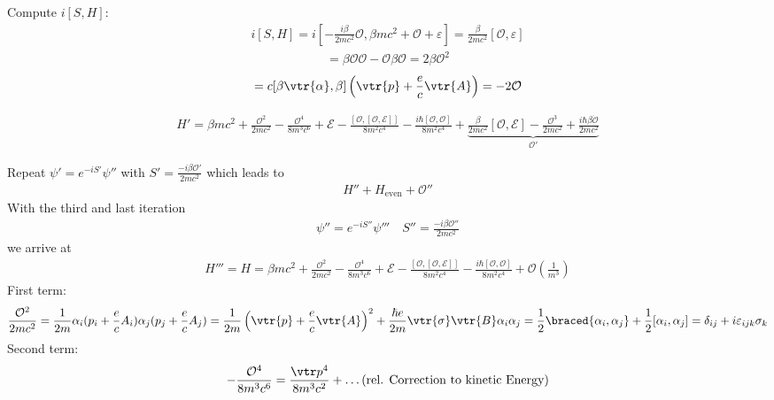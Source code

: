 Compute $i[S,H]$:
	\begin{align}[]
i[S,H]=i[-\frac{i\beta}{2mc^2}\mathcal{O},\beta mc^2+\mathcal{O}+\varepsilon]
=\frac{\beta}{2mc^2}[\mathcal{O},\varepsilon]
	\end{align}
	\begin{align}[]
	[\beta\mathcal{O},\mathcal{O}]=\beta\mathcal{O}\mathcal{O}-\mathcal{O}\beta\mathcal{O}
	=2\beta\mathcal{O}^2
	\end{align}
	\begin{align}[]
	[\mathcal{\beta\mathcal{O},\beta}]=c[\beta\vtr{\alpha},\beta]\left(\vtr{p}+\frac{e}				{c}\vtr{A}\right)=-2\mathcal{O}
	\end{align}

\begin{align}[]
H'=\beta mc^2+\frac{\mathcal{O}^2}{2mc^2}-\frac{\mathcal{O}^4}{8m^3c^6}+\mathcal{E}-\frac{[\mathcal{O},[\mathcal{O},\mathcal{E}]]}{8m^2c^4}
-\frac{i\hbar[\mathcal{O},\mathcal{O}]}{8m^2c^4}+\underbrace{\frac{\beta}{2mc^2}[\mathcal{O},\mathcal{E}]-\frac{\mathcal{O}^3}{2mc^2}+\frac{i\hbar\beta\dot{\mathcal{O}}}{2mc^2}}_{\mathcal{O}'}
\end{align}

Repeat $\psi'=e^{-iS'}\psi''$ with $S'=\frac{-i\beta\mathcal{O}'}{2mc^2}$ which leads to
\begin{align}[]
H''+H_{\text{even}}+\mathcal{O}''
\end{align}
With the third and last iteration
\begin{align}[]
\psi''=e^{-iS''}\psi'''\quad S''=\frac{-i\beta\mathcal{O}''}{2mc^2}
\end{align}
we arrive at
\begin{align}[]
H'''=H=\beta m c^2+\frac{\mathcal{O}^2}{2mc^2}-\frac{\mathcal{O}^4}{8m^3c^6}+\mathcal{E}
-\frac{[\mathcal{O},[\mathcal{O},\mathcal{E}]]}{8m^2c^4}-\frac{i\hbar[\mathcal{O},\mathcal{O}]}{8m^2c^4}+\mathcal{O}\left(\frac{1}{m^3}\right)
\end{align}
First term:
\begin{align}[]
\frac{\mathcal{O}^2}{2mc^2}=\frac{1}{2m}\alpha_i(p_i+\frac{e}{c}A_i)\alpha_j(p_j+\frac{e}{c}A_j)
=\frac{1}{2m}\left(\vtr{p}+\frac{e}{c}\vtr{A}\right)^2+\frac{\hbar e}{2m}\vtr{\sigma} \vtr{B} \alpha_i\alpha_j 
=\frac{1}{2}\braced{\alpha_i,\alpha_j}+\frac{1}{2}[\alpha_i,\alpha_j]
=\delta_{ij}+i\varepsilon_{ijk}\sigma_k
\end{align}
Second term:
\begin{align}[]
-\frac{\mathcal{O}^4}{8m^3c^6}=\frac{\vtr p^4}{8m^3c^2}+\ldots (\text{rel. Correction to kinetic Energy})
\end{align}

